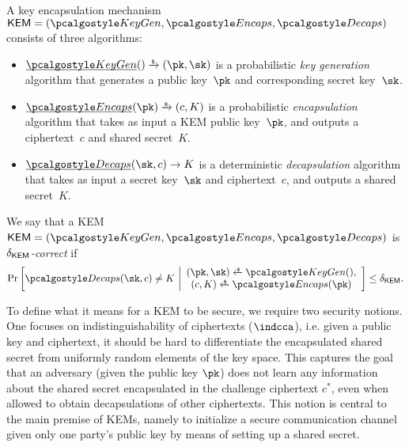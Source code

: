 \begin{definition}
    \label{def:kem}
    A key encapsulation mechanism $\KEM = (\kgen, \encaps, \decaps)$ consists of three algorithms:
    \begin{itemize}
        \item $\ul{\kgen}() \tor (\pk, \sk)$
        is a probabilistic \emph{key generation} algorithm that generates a public key~$\pk$ and corresponding secret key~$\sk$.
        \item $\ul{\encaps}(\pk) \tor (c, K)$
        is a probabilistic \emph{encapsulation} algorithm that takes as input a KEM public key~$\pk$, and outputs a ciphertext~$c$ and shared secret~$K$.
        \item $\ul{\decaps}(\sk, c) \to K$
        is a deterministic \emph{decapsulation} algorithm that takes as input a secret key~$\sk$ and ciphertext~$c$, and outputs a shared secret~$K$.
    \end{itemize}
\end{definition}

\begin{definition}
\label{def:kem-corr}
We say that a KEM~$\KEM=(\kgen, \encaps, \decaps)$ is \emph{$\delta_{\mathsf{KEM}}$-correct} if
\[
    \Pr\left[
        \decaps(\sk,c) \neq K
    ~\middle|
        \begin{array}{c}
        (\pk,\sk) \getsr \kgen(), \\
        (c, K) \getsr \encaps(\pk)
        \end{array}
    \right] \leq \delta_\KEM.
\]
\end{definition}

To define what it means for a KEM to be secure, we require two security notions. One focuses on indistinguishability of ciphertexts ($\indcca$), i.e. given a public key and ciphertext, it should be hard to differentiate the encapsulated shared secret from uniformly random elements of the key space.
This captures the goal that an adversary (given the public key $\pk$) does not learn any information about the shared secret encapsulated in the challenge ciphertext $c^*$, even when allowed to obtain decapsulations of other ciphertexts.
This notion is central to the main premise of KEMs, namely to initialize a secure communication channel given only one party's public key by means of setting up a shared secret.

